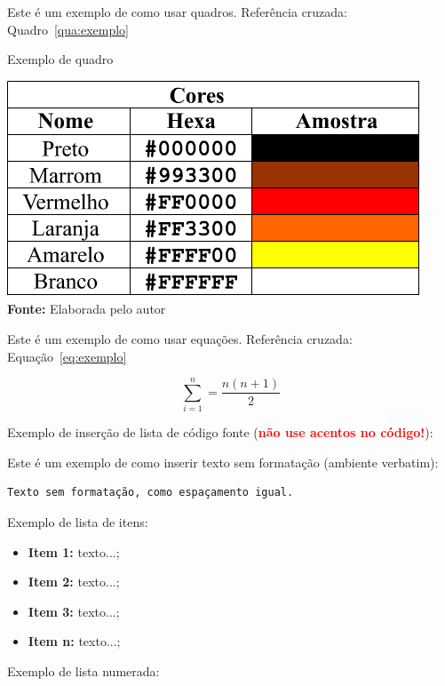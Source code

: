 Este é um exemplo de como usar quadros. Referência cruzada: Quadro~\ref{qua:exemplo}

\FloatBarrier
\begin{quadro}[!htbp]
	\centering
	\caption{Exemplo de quadro}
	\includegraphics[scale=.7]{imagens/exemploQuadro}
	\\\textbf{Fonte:} Elaborada pelo autor
	\label{qua:exemplo}
\end{quadro}
\FloatBarrier


Este é um exemplo de como usar equações. Referência cruzada: Equação~\ref{eq:exemplo}

\begin{equation}
\sum_{i=1}^{n} = \frac{n(n+1)}{2}
\label{eq:exemplo}
\end{equation}


Exemplo de inserção de lista de código fonte (\textbf{\textcolor{red}{não use acentos no código!}}):

 



Este é um exemplo de como inserir texto sem formatação (ambiente verbatim):

\begin{verbatim}
Texto sem formatação, como espaçamento igual.
\end{verbatim}


Exemplo de lista de itens:

\begin{itemize}
	\item \textbf{Item 1:} texto...;
	\item \textbf{Item 2:} texto...;
	\item \textbf{Item 3:} texto...;
	\item \textbf{Item n:} texto...;
\end{itemize}


Exemplo de lista numerada:

